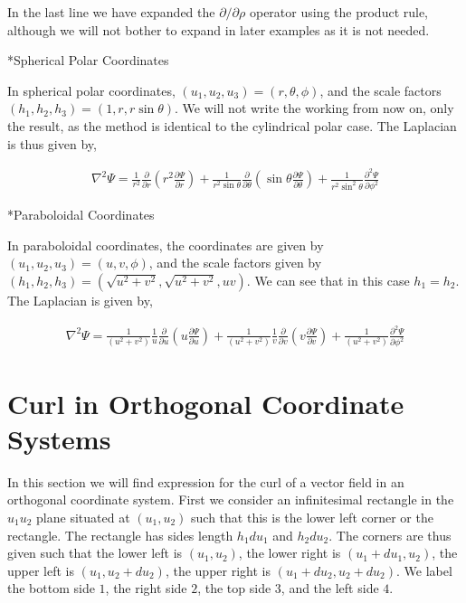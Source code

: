 \documentclass[11pt]{amsart}
\makeatletter
\def\subsection{\@startsection{subsection}{3}%
  \z@{.5\linespacing\@plus.7\linespacing}{.1\linespacing}%
  {\normalfont\itshape}}
\makeatother
\begin{document}
In the last line we have expanded the $\partial/\partial\rho$ operator using the product rule, although we will not bother to expand in later examples as it is not needed.

\subsection*{Spherical Polar Coordinates}

In spherical polar coordinates, $(u_1, u_2, u_3) = (r, \theta, \phi)$, and the scale factors $(h_1, h_2, h_3) = (1, r, r\sin\theta)$. We will not write the working from now on, only the result, as the method is identical to the cylindrical polar case. The Laplacian is thus given by,

\begin{align*}
  \nabla^2\Psi=\frac{1}{r^2}\frac{\partial}{\partial r}\left(r^2\frac{\partial\Psi}{\partial r}\right)+\frac{1}{r^2\sin\theta}\frac{\partial}{\partial\theta}\left(\sin\theta\frac{\partial\Psi}{\partial\theta}\right)+\frac{1}{r^2\sin^2\theta}\frac{\partial^2\Psi}{\partial\phi^2}
\end{align*}

\subsection*{Paraboloidal Coordinates}

In paraboloidal coordinates, the coordinates are given by $(u_1, u_2, u_3) = (u, v, \phi)$, and the scale factors given by $(h_1, h_2, h_3) = (\sqrt{u^2 + v^2}, \sqrt{u^2 + v^2}, uv)$. We can see that in this case $h_1 = h_2$. The Laplacian is given by,

\begin{align*}
  \nabla^2\Psi=\frac{1}{(u^2+v^2)}\frac{1}{u}\frac{\partial}{\partial u}\left(u\frac{\partial\Psi}{\partial u}\right)+\frac{1}{(u^2+v^2)}\frac{1}{v}\frac{\partial}{\partial v}\left(v \frac{\partial\Psi}{\partial v}\right)+\frac{1}{(u^2 + v^2)}\frac{\partial^2\Psi}{\partial\phi^2}
\end{align*}

\section{Curl in Orthogonal Coordinate Systems}

In this section we will find expression for the curl of a vector field in an orthogonal coordinate system. First we consider an infinitesimal rectangle in the $u_1u_2$ plane situated at $(u_1, u_2)$ such that this is the lower left corner or the rectangle. The rectangle has sides length $h_1du_1$ and $h_2du_2$. The corners are thus given such that the lower left is $(u_1, u_2)$, the lower right is $(u_1 + du_1, u_2)$, the upper left is $(u_1, u_2 + du_2)$, the upper right is $(u_1 + du_2, u_2 + du_2)$. We label the bottom side $1$, the right side $2$, the top side $3$, and the left side $4$.
\end{document}
